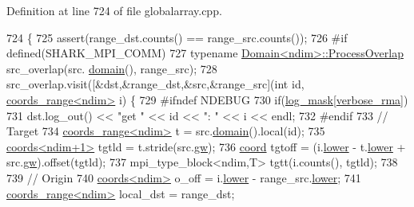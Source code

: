 Definition at line 724 of file globalarray.\+cpp.


\begin{DoxyCode}
724                                                                                                            
                               \{
725     assert(range\_dst.counts() == range\_src.counts());
726 \textcolor{preprocessor}{#if defined(SHARK\_MPI\_COMM)}
727     \textcolor{keyword}{typename} \hyperlink{classshark_1_1ndim_1_1_domain_1_1_process_overlap}{Domain<ndim>::ProcessOverlap} src\_overlap(src.
      \hyperlink{classshark_1_1ndim_1_1_global_array_a435ee8ff23c3feadf2ef2be64d4f375c}{domain}(), range\_src);
728     src\_overlap.visit([&dst,&range\_dst,&src,&range\_src](\textcolor{keywordtype}{int} \textcolor{keywordtype}{id}, 
      \hyperlink{structshark_1_1ndim_1_1coords__range}{coords\_range<ndim>} i) \{
729 \textcolor{preprocessor}{#ifndef NDEBUG}
730             \textcolor{keywordflow}{if}(\hyperlink{namespaceshark_a110e03e8104b06caef346fcc25621aa9}{log\_mask}[\hyperlink{namespaceshark_a8faafcaa495b6cf0c0eca37a846e45f2}{verbose\_rma}])
731                dst.log\_out() << \textcolor{stringliteral}{"get "} << \textcolor{keywordtype}{id} << \textcolor{stringliteral}{": "} << i << endl;
732 \textcolor{preprocessor}{#endif}
733             \textcolor{comment}{// Target}
734             \hyperlink{structshark_1_1ndim_1_1coords__range}{coords\_range<ndim>} t = src.\hyperlink{classshark_1_1ndim_1_1_global_array_a435ee8ff23c3feadf2ef2be64d4f375c}{domain}().local(\textcolor{keywordtype}{id});
735             \hyperlink{structshark_1_1ndim_1_1coords}{coords<ndim+1>} tgtld = t.stride(src.\hyperlink{classshark_1_1ndim_1_1_global_array_a38d93d114d585e5e5491c5ecd35c6bfc}{gw});
736             \hyperlink{namespaceshark_a767a92d5dd82cb82266473bff42fa6d9}{coord} tgtoff = (i.\hyperlink{structshark_1_1ndim_1_1coords__range_a46cae2c424d7b20f911a970c92581b19}{lower} - t.\hyperlink{structshark_1_1ndim_1_1coords__range_a46cae2c424d7b20f911a970c92581b19}{lower} + src.\hyperlink{classshark_1_1ndim_1_1_global_array_a38d93d114d585e5e5491c5ecd35c6bfc}{gw}).offset(tgtld);
737             mpi\_type\_block<ndim,T> tgtt(i.counts(), tgtld);
738      
739             \textcolor{comment}{// Origin}
740             \hyperlink{structshark_1_1ndim_1_1coords}{coords<ndim>} o\_off = i.\hyperlink{structshark_1_1ndim_1_1coords__range_a46cae2c424d7b20f911a970c92581b19}{lower} - range\_src.\hyperlink{structshark_1_1ndim_1_1coords__range_a46cae2c424d7b20f911a970c92581b19}{lower};  
741             \hyperlink{structshark_1_1ndim_1_1coords__range}{coords\_range<ndim>} local\_dst = range\_dst;

\end{DoxyCode}
